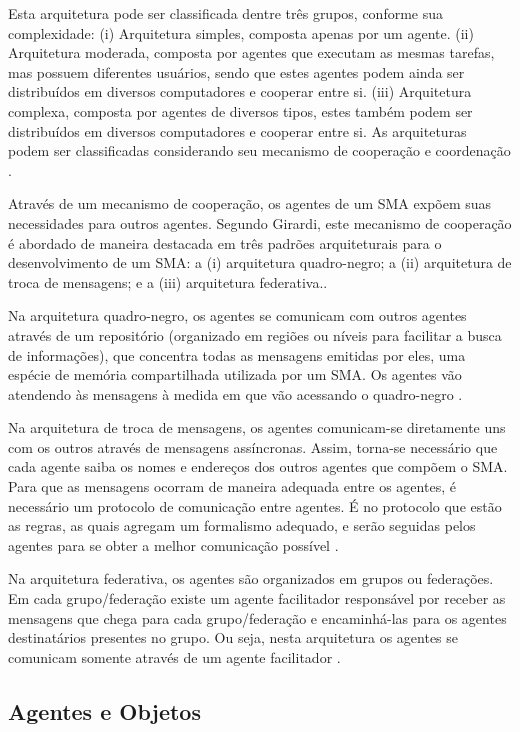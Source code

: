  Esta arquitetura pode ser classificada dentre três grupos, conforme sua complexidade: (i) Arquitetura simples, composta apenas por um agente. (ii) Arquitetura moderada, composta por agentes que executam as mesmas tarefas, mas possuem diferentes usuários, sendo que estes agentes podem ainda ser distribuídos em diversos computadores e cooperar entre si. (iii) Arquitetura complexa, composta por agentes de diversos tipos, estes também podem ser distribuídos em diversos computadores e cooperar entre si. As arquiteturas podem ser classificadas considerando seu mecanismo de cooperação e coordenação .

Através de um mecanismo de cooperação, os agentes de um SMA expõem suas necessidades para outros agentes. Segundo Girardi, este mecanismo de cooperação é abordado de maneira destacada em três padrões arquiteturais para o desenvolvimento de um SMA: a (i) arquitetura quadro-negro; a (ii) arquitetura de troca de mensagens; e a (iii) arquitetura federativa.\cite[p. 7]{girardi2004}. 

Na arquitetura quadro-negro, os agentes se comunicam com outros agentes através de um repositório (organizado em regiões ou níveis para facilitar a busca de informações), que concentra todas as mensagens emitidas por eles, uma espécie de memória compartilhada utilizada por um SMA. Os agentes vão atendendo às mensagens à medida em que vão acessando o quadro-negro \cite[p. 7]{girardi2004}.

Na arquitetura de troca de mensagens, os agentes comunicam-se diretamente uns com os outros através de mensagens assíncronas. Assim, torna-se necessário que cada agente saiba os nomes e endereços dos outros agentes que compõem o SMA. Para que as mensagens ocorram de maneira adequada entre os agentes, é necessário um protocolo de comunicação entre agentes. É no protocolo que estão as regras, as quais agregam um formalismo adequado, e serão seguidas pelos agentes para se obter a melhor comunicação possível \cite[p. 8]{girardi2004}.

Na arquitetura federativa, os agentes são organizados em grupos ou federações. Em cada grupo/federação existe um agente facilitador responsável por receber as mensagens que chega para cada grupo/federação e encaminhá-las para os agentes destinatários presentes no grupo. Ou seja, nesta arquitetura os agentes se comunicam somente através de um agente facilitador \cite[p. 8]{girardi2004}.


\subsection{Agentes e Objetos}

